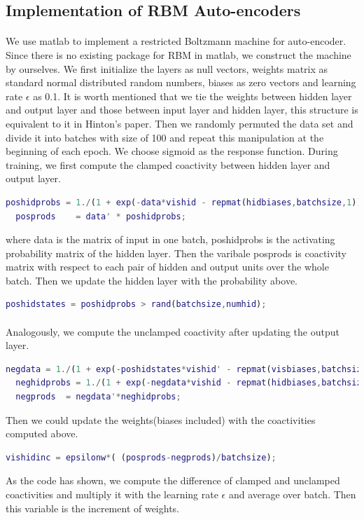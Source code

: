 \documentclass{article}
\begin{document}
\subsection{Implementation of RBM Auto-encoders}
\paragraph{}We use matlab to implement a restricted Boltzmann machine for auto-encoder. Since there is no existing package for RBM in matlab, we construct the machine by ourselves. We first initialize the layers as null vectors, weights matrix as standard normal distributed random numbers, biases as zero vectors and learning rate $\epsilon$ as 0.1. It is worth mentioned that we tie the weights between hidden layer and output layer and those between input layer and hidden layer, this structure is equivalent to it in Hinton's paper. Then we randomly permuted the data set and divide it into batches with size of 100 and repeat this manipulation at the beginning of each epoch. We choose sigmoid as the response function. During training, we first compute the clamped coactivity between hidden layer and output layer.
\begin{lstlisting}[language=Matlab]
  poshidprobs = 1./(1 + exp(-data*vishid - repmat(hidbiases,batchsize,1)));
  posprods    = data' * poshidprobs;
\end{lstlisting}
where data is the matrix of input in one batch, poshidprobs is the activating probability matrix of the hidden layer. Then the varibale posprods is coactivity matrix with respect to each pair of hidden and output units over the whole batch. Then we update the hidden layer with the probability above.
\begin{lstlisting}[language=Matlab]
poshidstates = poshidprobs > rand(batchsize,numhid);
\end{lstlisting}
\paragraph{}
Analogously, we compute the unclamped coactivity after updating the output layer.
\begin{lstlisting}[language=Matlab]
  negdata = 1./(1 + exp(-poshidstates*vishid' - repmat(visbiases,batchsize,1)));
  neghidprobs = 1./(1 + exp(-negdata*vishid - repmat(hidbiases,batchsize,1)));
  negprods  = negdata'*neghidprobs;
\end{lstlisting}
Then we could update the weights(biases included) with the coactivities computed above.
\begin{lstlisting}[language=Matlab]
    vishidinc = epsilonw*( (posprods-negprods)/batchsize);
\end{lstlisting}
As the code has shown, we compute the difference of clamped and unclamped coactivities and multiply it with the learning rate $\epsilon$ and average over batch. Then this variable is the increment of weights.
\end{document}
